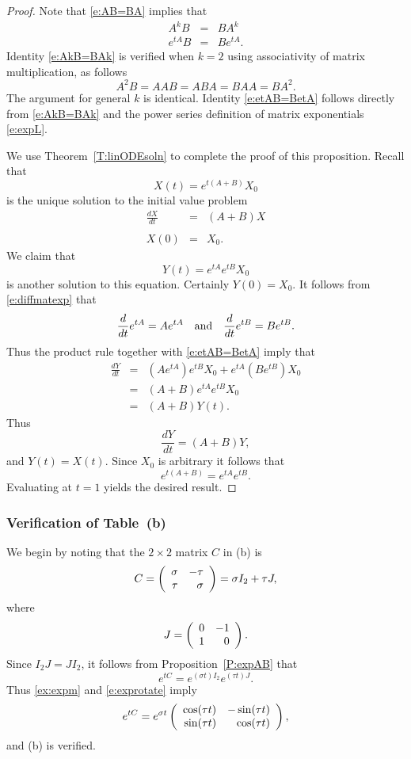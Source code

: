 \documentclass{ximera}
\begin{document}
\begin{proof}  Note that \eqref{e:AB=BA} implies that
\begin{eqnarray}
A^kB    & = & BA^k  \label{e:AkB=BAk}\\
e^{tA}B & = & Be^{tA}. \label{e:etAB=BetA}
\end{eqnarray}
Identity \eqref{e:AkB=BAk} is verified when $k=2$ using
associativity of matrix multiplication, as follows
\[
A^2B = AAB = ABA = BAA = BA^2.
\]
The argument for general $k$ is identical.  Identity
\eqref{e:etAB=BetA} follows directly from \eqref{e:AkB=BAk} and
the power series definition of matrix exponentials \eqref{e:expL}.

We use Theorem~\ref{T:linODEsoln}  to complete the proof of this
proposition.  Recall that
\[
X(t) = e^{t(A+B)}X_0
\]
is the unique solution to the initial value problem
\begin{eqnarray*}
\frac{dX}{dt} & = & (A+B)X \\ \\
X(0) & = & X_0.
\end{eqnarray*}
We claim that
\[
Y(t) = e^{tA}e^{tB}X_0
\]
is another solution to this equation.  Certainly $Y(0)=X_0$.  It
follows from \eqref{e:diffmatexp} that
\[
\frac{d}{dt}e^{tA} = Ae^{tA} \quad\mbox{and}\quad \frac{d}{dt}e^{tB} = Be^{tB}.
\]
Thus the product rule together with \eqref{e:etAB=BetA} imply that
\begin{eqnarray*}
\frac{dY}{dt} & = & \left(Ae^{tA}\right)e^{tB}X_0 +
e^{tA}\left(Be^{tB}\right)X_0 \\
& = & (A+B) e^{tA} e^{tB} X_0\\
& = & (A+B)Y(t).
\end{eqnarray*}
Thus
\[
\frac{dY}{dt} = (A+B)Y,
\]
and $Y(t)=X(t)$.  Since $X_0$ is arbitrary it follows that
\[
e^{t(A+B)} = e^{tA}e^{tB}.
\]
Evaluating at $t=1$ yields the desired result.  \end{proof}

\subsubsection{Verification of Table~\protect{\ref{T:3sys}}(b)}

We begin by noting that the $2\times 2$ matrix $C$ in (b) is
\[
C = \left(\begin{array}{rr} \sigma & -\tau\\ \tau &\sigma\end{array}\right) = \sigma I_2 + \tau J,
\]
where
\[
J= \left(\begin{array}{rr} 0 & -1\\ 1 &0\end{array}\right).
\]
Since $I_2J=JI_2$, it follows from Proposition~\ref{P:expAB} that
\[
e^{tC} = e^{(\sigma t)I_2} e^{(\tau t)J}.
\]
Thus \eqref{ex:expm} and \eqref{e:exprotate} imply
\begin{equation}  \label{e:exprotation}
e^{tC} = e^{\sigma t}
\left(\begin{array}{rr} \cos(\tau t) & -\sin(\tau t)\\ \sin(\tau t) &\cos(\tau t)\end{array}\right),
\end{equation}
and (b) is verified.
\end{document}
